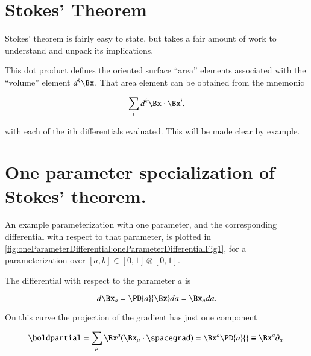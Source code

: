 %
%
\section{Stokes' Theorem}

Stokes' theorem is fairly easy to state, but takes a fair amount of work to understand and unpack its implications.



This dot product defines the oriented surface ``area'' elements associated with the ``volume'' element \( d^k \Bx \).  That area element can be obtained from the mnemonic

\begin{dmath}\label{eqn:stokesTheoremCore:1561}
\sum_i d^k \Bx \cdot \Bx^i,
\end{dmath}

with each of the ith differentials evaluated.  This will be made clear by example.

\section{One parameter specialization of Stokes' theorem.}

An example parameterization with one parameter, and the corresponding differential with respect to that parameter, is plotted in
\cref{fig:oneParameterDifferential:oneParameterDifferentialFig1}, for a parameterization over \( [a, b] \in [0,1]\otimes[0,1] \).


The differential with respect to the parameter \( a \) is

\begin{equation}\label{eqn:stokesTheoremCore:20}
d\Bx_a = \PD{a}{\Bx} da = \Bx_a da.
\end{equation}

On this curve the projection of the gradient has just one component

\begin{dmath}\label{eqn:stokesTheoremCore:40}
\boldpartial
=
\sum_\mu \Bx^\mu (\Bx_\mu \cdot \spacegrad)
=
\Bx^a \PD{a}{}
\equiv
\Bx^a \partial_a.
\end{dmath}

